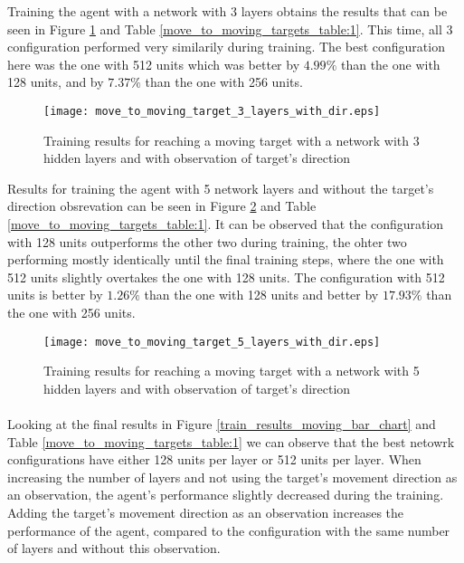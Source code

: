 Training the agent with a network with 3 layers obtains the results that can be seen in Figure \ref{train_results_moving_3_layers_with_dir} and Table \ref{move_to_moving_targets_table:1}. This time, all 3 configuration performed very similarily during training. The best configuration here was the one with 512 units which was better by $4.99\%$ than the one with 128 units, and by $7.37\%$ than the one with 256 units.

\begin{figure}
    \begin{center}
        \texttt{[image: move\_to\_moving\_target\_3\_layers\_with\_dir.eps]}
        \caption{Training results for reaching a moving target with a network with 3 hidden layers and with observation of target's direction}
        \label{train_results_moving_3_layers_with_dir}
    \end{center}
\end{figure}

Results for training the agent with 5 network layers and without the target's direction obsrevation can be seen in Figure \ref{train_results_moving_5_layers_with_dir} and Table \ref{move_to_moving_targets_table:1}. It can be observed that the configuration with 128 units outperforms the other two during training, the ohter two performing mostly identically until the final training steps, where the one with 512 units slightly overtakes the one with 128 units. The configuration with 512 units is better by $1.26\%$ than the one with 128 units and better by $17.93\%$ than the one with 256 units.

\begin{figure}
    \begin{center}
        \texttt{[image: move\_to\_moving\_target\_5\_layers\_with\_dir.eps]}
        \caption{Training results for reaching a moving target with a network with 5 hidden layers and with observation of target's direction}
        \label{train_results_moving_5_layers_with_dir}
    \end{center}
\end{figure}


\paragraph{}
Looking at the final results in Figure \ref{train_results_moving_bar_chart} and Table \ref{move_to_moving_targets_table:1} we can observe that the best netowrk configurations have either 128 units per layer or 512 units per layer. When increasing the number of layers and not using the target's movement direction as an observation, the agent's performance slightly decreased during the training. Adding the target's movement direction as an observation increases the performance of the agent, compared to the configuration with the same number of layers and without this observation. 

